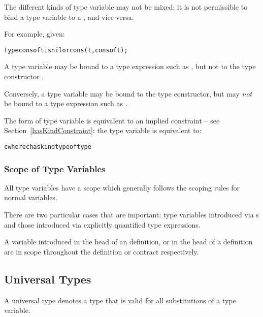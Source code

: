 \begin{aside}
The different kinds of type variable may not be mixed: it is not permissible to bind a type variable to a , and vice versa.

For example, given:
\begin{alltt}
type cons of t is nil or cons(t, cons of t);
\end{alltt}
A type variable  may be bound to a type expression such as , but not to the type constructor .

Conversely, a type variable  may be bound to the  type constructor, but may \emph{not} be bound to a type expression such as .
\begin{aside}
The \q{\pcent{}\pcent{}} form of type variable is equivalent to an implied  constraint -- see Section~\vref{hasKindConstraint}: the type variable  is equivalent to:

\begin{alltt}
c where c has kind type of type
\end{alltt}
\end{aside}
\end{aside}

\subsubsection{Scope of Type Variables}
\label{typeVarScope}

All type variables have a scope which generally follows the scoping rules for normal variables.

There are two particular cases that are important: type variables introduced via s and those introduced via explicitly quantified type expressions.

A variable introduced in the head of an  definition, or in the head of a  definition are in scope throughout the definition or contract respectively.

\subsection{Universal Types}
\label{universalType}
A universal type denotes a type that is valid for all substitutions of a type variable.

